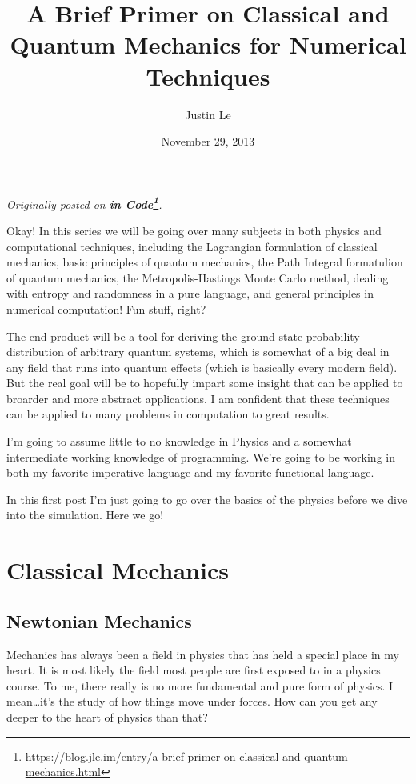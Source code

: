 \documentclass[]{article}
\title{A Brief Primer on Classical and Quantum Mechanics for Numerical Techniques}
\author{Justin Le}
\date{November 29, 2013}
\renewcommand{\href}[2]{#2\footnote{\url{#1}}}
\begin{document}
\maketitle

\emph{Originally posted on
\textbf{\href{https://blog.jle.im/entry/a-brief-primer-on-classical-and-quantum-mechanics.html}{in
Code}}.}

Okay! In this series we will be going over many subjects in both physics and
computational techniques, including the Lagrangian formulation of classical
mechanics, basic principles of quantum mechanics, the Path Integral formatulion
of quantum mechanics, the Metropolis-Hastings Monte Carlo method, dealing with
entropy and randomness in a pure language, and general principles in numerical
computation! Fun stuff, right?

The end product will be a tool for deriving the ground state probability
distribution of arbitrary quantum systems, which is somewhat of a big deal in
any field that runs into quantum effects (which is basically every modern
field). But the real goal will be to hopefully impart some insight that can be
applied to broarder and more abstract applications. I am confident that these
techniques can be applied to many problems in computation to great results.

I'm going to assume little to no knowledge in Physics and a somewhat
intermediate working knowledge of programming. We're going to be working in both
my favorite imperative language and my favorite functional language.

In this first post I'm just going to go over the basics of the physics before we
dive into the simulation. Here we go!

\section{Classical Mechanics}\label{classical-mechanics}

\subsection{Newtonian Mechanics}\label{newtonian-mechanics}

Mechanics has always been a field in physics that has held a special place in my
heart. It is most likely the field most people are first exposed to in a physics
course. To me, there really is no more fundamental and pure form of physics. I
mean\ldots{}it's the study of how things move under forces. How can you get any
deeper to the heart of physics than that?
\end{document}
